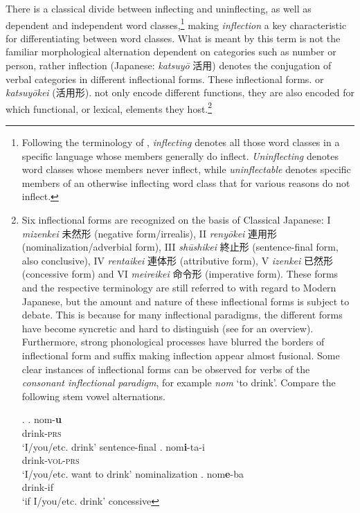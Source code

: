 \documentclass [output=book,colorlinks,citecolor=brown]{langscibook}
\begin{document}
There is a classical divide between inflecting and uninflecting, as well as dependent and independent word classes,\footnote{Following the terminology of \citet{spencer:2020:uninflectedness}, \textit{inflecting} denotes all those word classes in a specific language whose members generally do inflect. \textit{Uninflecting} denotes word classes whose members never inflect, while \textit{uninflectable} denotes specific members of an otherwise inflecting word class that for various reasons do not inflect.} making \textit{inflection} a key characteristic for differentiating between word classes. What is meant by this term is not the familiar morphological alternation dependent on categories such as number or person, rather inflection (Japanese: \textit{katsuyō} 活用) denotes the conjugation of verbal categories in different inflectional forms. These inflectional forms. or \textit{katsuyōkei} (活用形). not only encode different functions, they are also encoded for which functional, or lexical, elements they host.\footnote{Six inflectional forms are recognized on the basis of Classical Japanese: I \textit{mizenkei} 未然形 (negative form/irrealis), II \textit{renyōkei} 連用形 (nominalization/adverbial form), III \textit{shūshikei} 終止形 (sentence-final form, also conclusive), IV \textit{rentaikei} 連体形 (attributive form), V \textit{izenkei} 已然形 (concessive form) and VI \textit{meireikei} 命令形 (imperative form). These forms and the respective terminology are still referred to with regard to Modern Japanese, but the amount and nature of these inflectional forms is subject to debate. This is because for many inflectional paradigms, the different forms have become syncretic and hard to distinguish (see \citealt{kohlich:2023:uninflecting} for an overview). Furthermore, strong phonological processes have blurred the borders of inflectional form and suffix making inflection appear almost fusional. Some clear instances of inflectional forms can be observed for verbs of the \textit{consonant inflectional paradigm}, for example \textit{nom} `to drink'. Compare the following stem vowel alternations.

\par

\ex. \ag. nom-\textbf{u}\\
drink-\textsc{prs}\\
`I/you/etc. drink' \null \hfill sentence-final
\bg. nom\textbf{i}-ta-i\\
drink-\textsc{vol}-\textsc{prs}\\
`I/you/etc. want to drink' \null \hfill nominalization
\cg. nom\textbf{e}-ba\\
drink-if\\
`if I/you/etc. drink' \null \hfill concessive

}
\end{document}
